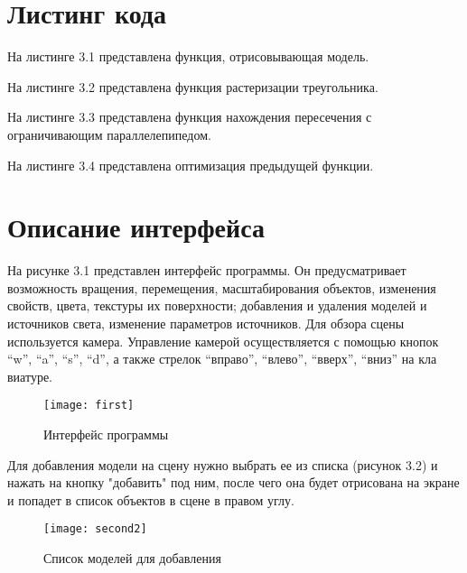 \documentclass[12pt,a4paper,oneside]{report}
\begin{document}
	\section{Листинг кода}
	 \quad На листинге 3.1 представлена функция, отрисовывающая модель.
	
	
	
	 На листинге 3.2 представлена функция растеризации треугольника.
	
	
	
	 На листинге 3.3 представлена функция нахождения пересечения с ограничивающим параллелепипедом.
	
	
	
	 На листинге 3.4 представлена оптимизация предыдущей функции.
	
	
	

	\section{Описание интерфейса}
	\quad  На рисунке 3.1 представлен интерфейс программы. 
	Он предусматривает возможность вращения, перемещения, масштабирования объектов, изменения свойств, цвета, текстуры их поверхности; добавления и удаления моделей и источников света, изменение параметров источников. Для обзора сцены используется камера. Управление камерой осуществляется с помощью кнопок “w”, “a”, “s”, “d”, а также стрелок “вправо”, “влево”, “вверх”, “вниз” на кла	виатуре.
	
		
	
	\begin{figure}[H]
		\centering
		\texttt{[image: first]}
		\caption{Интерфейс программы}
	\end{figure}

	Для добавления модели на сцену нужно выбрать ее из списка (рисунок 3.2) и нажать на кнопку "добавить" под ним, после чего она будет отрисована на экране и попадет в список объектов в сцене в правом углу.
	
	 \begin{figure}[H]
		\centering
		\texttt{[image: second2]}
		\caption{Список моделей для добавления}
	\end{figure}
	
\end{document}
